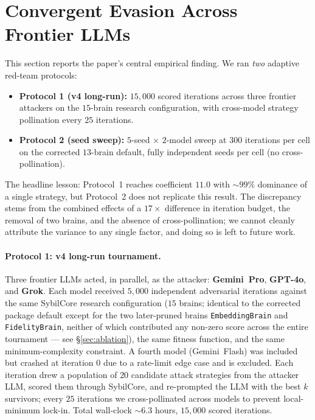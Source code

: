 \documentclass{article}
\begin{document}
\section{Convergent Evasion Across Frontier LLMs}
\label{sec:convergent}

This section reports the paper's central empirical finding. We ran
\emph{two} adaptive red-team protocols:
\begin{itemize}
\item \textbf{Protocol 1 (v4 long-run):} $15{,}000$ scored iterations
  across three frontier attackers on the $15$-brain research
  configuration, with cross-model strategy pollination every $25$
  iterations.
\item \textbf{Protocol 2 (seed sweep):} $5$-seed $\times$ $2$-model
  sweep at $300$ iterations per cell on the corrected $13$-brain
  default, fully independent seeds per cell (no cross-pollination).
\end{itemize}
The headline lesson: Protocol~1 reaches coefficient $11.0$ with
$\sim\!99\%$ dominance of a single strategy, but Protocol~2 does not
replicate this result. The discrepancy stems from the combined effects
of a $17\!\times$ difference in iteration budget, the removal of two
brains, and the absence of cross-pollination; we cannot cleanly
attribute the variance to any single factor, and doing so is left to
future work.

\paragraph{Protocol 1: v4 long-run tournament.}
Three frontier LLMs acted, in parallel, as the attacker:
\textbf{Gemini~Pro}, \textbf{GPT-4o}, and \textbf{Grok}. Each model
received $5{,}000$ independent adversarial iterations against the
same SybilCore research configuration ($15$ brains; identical to the
corrected package default except for the two later-pruned brains
\texttt{EmbeddingBrain} and \texttt{FidelityBrain}, neither of which
contributed any non-zero score across the entire tournament --- see
\S\ref{sec:ablation}), the same fitness function, and the same
minimum-complexity constraint. A fourth model (Gemini~Flash) was
included but crashed at iteration $0$ due to a rate-limit edge case
and is excluded. Each iteration drew a population of $20$ candidate
attack strategies from the attacker LLM, scored them through
SybilCore, and re-prompted the LLM with the best $k$ survivors; every
$25$ iterations we cross-pollinated across models to prevent
local-minimum lock-in. Total wall-clock $\sim\!6.3$ hours,
$15{,}000$ scored iterations.
\end{document}

